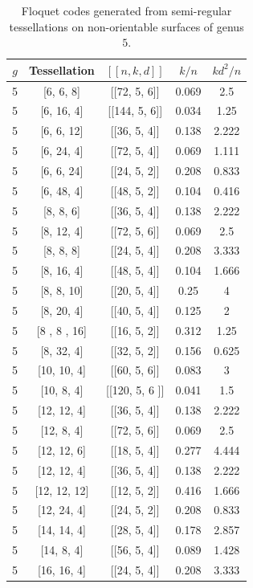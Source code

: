 \documentclass[%
reprint,
amsmath,amssymb,
aps,
]{revtex4-2}
\begin{document}
\begin{table}[b]
	\caption{\label{nog5}
		Floquet codes generated from semi-regular tessellations on non-orientable surfaces of genus $5$.}
	\begin{ruledtabular}
		\begin{tabular}{|c|c|c|c|c|}
			$g$ & Tessellation & $[[n,k,d]]$ & $k/n$ & $kd^{2}/n$ \\ \hline
	5 & [6, 6, 8] & [[72, 5, 6]] & 0.069 & 2.5  \\
	5 & [6, 16, 4] & [[144, 5, 6]] & 0.034 & 1.25  \\
	5 & [6, 6, 12] & [[36, 5, 4]] & 0.138 & 2.222  \\
	5 & [6, 24, 4] & [[72, 5, 4]] & 0.069 & 1.111  \\
	5 & [6, 6, 24] & [[24, 5, 2]] & 0.208 & 0.833   \\
	5 & [6, 48, 4] & [[48, 5, 2]] & 0.104 & 0.416   \\
	5 & [8, 8, 6] & [[36, 5, 4]] & 0.138 & 2.222  \\
	5 & [8, 12, 4] & [[72, 5, 6]] & 0.069 & 2.5   \\
	5 & [8, 8, 8] & [[24, 5, 4]] & 0.208 & 3.333  \\
	5 & [8, 16, 4] & [[48, 5, 4]] & 0.104 & 1.666  \\
	5 & [8, 8, 10] & [[20, 5, 4]] & 0.25 & 4  \\
	5 & [8, 20, 4] & [[40, 5, 4]] & 0.125 & 2  \\
	5 & [8 , 8 , 16] & [[16, 5, 2]] & 0.312 & 1.25  \\
	5 & [8, 32, 4] & [[32, 5, 2]] & 0.156 & 0.625 \\
	5 & [10, 10, 4] & [[60, 5, 6]] & 0.083 & 3  \\
	5 & [10, 8, 4] & [[120, 5, 6 ]] & 0.041 & 1.5  \\
	5 & [12, 12, 4] & [[36, 5, 4]] & 0.138 & 2.222  \\
	5 & [12, 8, 4] & [[72, 5, 6]] & 0.069 & 2.5 \\
	5 & [12, 12, 6] & [[18, 5, 4]] & 0.277 & 4.444  \\
	5 & [12, 12, 4] & [[36, 5, 4]] & 0.138 & 2.222  \\
	5 & [12, 12, 12] & [[12, 5, 2]] & 0.416 & 1.666  \\
	5 & [12, 24, 4] & [[24, 5, 2]] & 0.208 & 0.833  \\
	5 & [14, 14, 4] & [[28, 5, 4]] & 0.178 & 2.857  \\
	5 & [14, 8, 4] & [[56, 5, 4]] & 0.089 & 1.428  \\
	5 & [16, 16, 4] & [[24, 5, 4]] & 0.208 & 3.333  \\

\end{tabular}
\end{ruledtabular}
\end{table}
\end{document}
